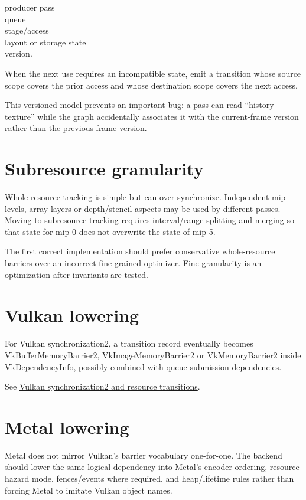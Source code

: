 producer pass\\
queue\\
stage/access\\
layout or storage state\\
version.

When the next use requires an incompatible state, emit a transition whose source scope covers the prior access and whose destination scope covers the next access.

This versioned model prevents an important bug: a pass can read ``history texture'' while the graph accidentally associates it with the current-frame version rather than the previous-frame version.

\section{Subresource granularity}\label{appendix-0fc95374cb7e-subresource-granularity}

Whole-resource tracking is simple but can over-synchronize. Independent mip levels, array layers or depth/stencil aspects may be used by different passes. Moving to subresource tracking requires interval/range splitting and merging so that state for mip 0 does not overwrite the state of mip 5.

The first correct implementation should prefer conservative whole-resource barriers over an incorrect fine-grained optimizer. Fine granularity is an optimization after invariants are tested.

\section{Vulkan lowering}\label{appendix-0fc95374cb7e-vulkan-lowering}

For Vulkan synchronization2, a transition record eventually becomes VkBufferMemoryBarrier2, VkImageMemoryBarrier2 or VkMemoryBarrier2 inside VkDependencyInfo, possibly combined with queue submission dependencies.

See \hyperref[appendix-f15ce0d9c170]{Vulkan synchronization2 and resource transitions}.

\section{Metal lowering}\label{appendix-0fc95374cb7e-metal-lowering}

Metal does not mirror Vulkan's barrier vocabulary one-for-one. The backend should lower the same logical dependency into Metal's encoder ordering, resource hazard mode, fences/events where required, and heap/lifetime rules rather than forcing Metal to imitate Vulkan object names.

